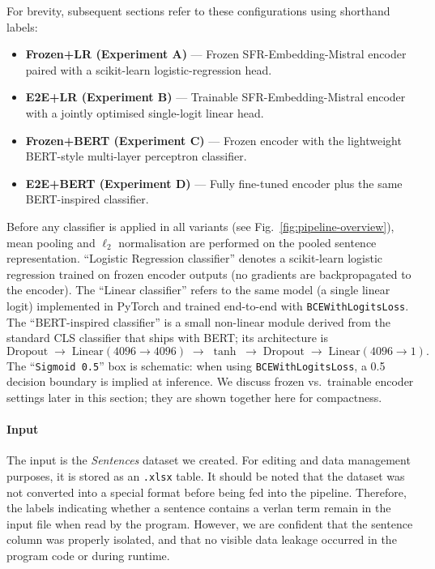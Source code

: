 \documentclass[12pt]{article}
\begin{document}
\noindent For brevity, subsequent sections refer to these configurations using shorthand labels:
\begin{itemize}
  \item \textbf{Frozen+LR (Experiment A)} --- Frozen SFR-Embedding-Mistral encoder paired with a scikit-learn logistic-regression head.
  \item \textbf{E2E+LR (Experiment B)} --- Trainable SFR-Embedding-Mistral encoder with a jointly optimised single-logit linear head.
  \item \textbf{Frozen+BERT (Experiment C)} --- Frozen encoder with the lightweight BERT-style multi-layer perceptron classifier.
  \item \textbf{E2E+BERT (Experiment D)} --- Fully fine-tuned encoder plus the same BERT-inspired classifier.
\end{itemize}

\noindent Before any classifier is applied in all variants (see Fig.~\ref{fig:pipeline-overview}), mean pooling and \(\ell_{2}\) normalisation are performed on the pooled sentence representation. ``Logistic Regression classifier'' denotes a scikit-learn logistic regression trained on frozen encoder outputs (no gradients are backpropagated to the encoder). The ``Linear classifier'' refers to the same model (a single linear logit) implemented in PyTorch and trained end-to-end with \texttt{BCEWithLogitsLoss}. The ``BERT-inspired classifier'' is a small non-linear module derived from the standard CLS classifier that ships with BERT; its architecture is
\[
\text{Dropout} \;\to\; \text{Linear}(4096\!\to\!4096) \;\to\; \tanh \;\to\; \text{Dropout} \;\to\; \text{Linear}(4096\!\to\!1).
\]
The ``\texttt{Sigmoid 0.5}'' box is schematic: when using \texttt{BCEWithLogitsLoss}, a 0.5 decision boundary is implied at inference. We discuss frozen vs.\ trainable encoder settings later in this section; they are shown together here for compactness.


\paragraph{Input}
The input is the \textit{Sentences} dataset we created. For editing and data management purposes, it is stored as an \texttt{.xlsx} table. It should be noted that the dataset was not converted into a special format before being fed into the pipeline. Therefore, the labels indicating whether a sentence contains a verlan term remain in the input file when read by the program. However, we are confident that the sentence column was properly isolated, and that no visible data leakage occurred in the program code or during runtime.
\end{document}
